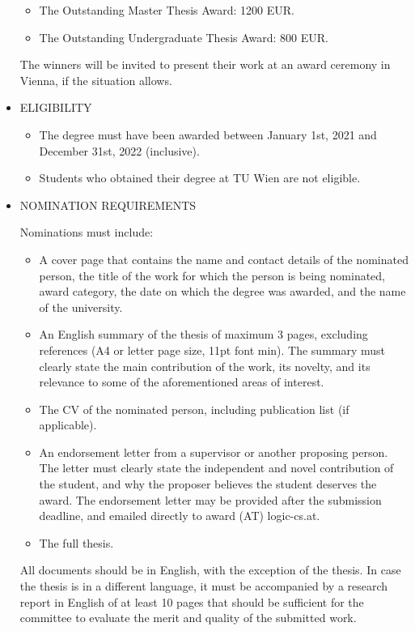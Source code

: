 \documentclass[prodmode,acmtecs]{acmsmall} %
\begin{document}
\begin{itemize}
\begin{itemize}\item  The Outstanding Master Thesis Award: 1200 EUR.
\item  The Outstanding Undergraduate Thesis Award: 800 EUR.
\end{itemize} 
  The winners will be invited to present their work at an award ceremony in Vienna, if the situation allows. 
 
\item  ELIGIBILITY 
 
\begin{itemize}\item  The degree must have been awarded between January 1st, 2021 and December 31st, 2022 (inclusive).
\item  Students who obtained their degree at TU Wien are not eligible.
\end{itemize} 
\item  NOMINATION REQUIREMENTS 
 
  Nominations must include: 
 
\begin{itemize}\item  A cover page that contains the name and contact details of the nominated person, the title of the work for which the person is being nominated, award category, the date on which the degree was awarded, and the name of the university.
\item  An English summary of the thesis of maximum 3 pages, excluding references (A4 or letter page size, 11pt font min). The summary must clearly state the main contribution of the work, its novelty, and its relevance to some of the aforementioned areas of interest.
\item  The CV of the nominated person, including publication list (if applicable).
\item  An endorsement letter from a supervisor or another proposing person. The letter must clearly state the independent and novel contribution of the student, and why the proposer believes the student deserves the award. The endorsement letter may be provided after the submission deadline, and emailed directly to award (AT) logic-cs.at.
\item  The full thesis.
\end{itemize} 
  All documents should be in English, with the exception of the thesis. In case the thesis is in a different language, it must be accompanied by a research report in English of at least 10 pages that should be sufficient for the committee to evaluate the merit and quality of the submitted work. 
 

\end{itemize}
\end{document}
